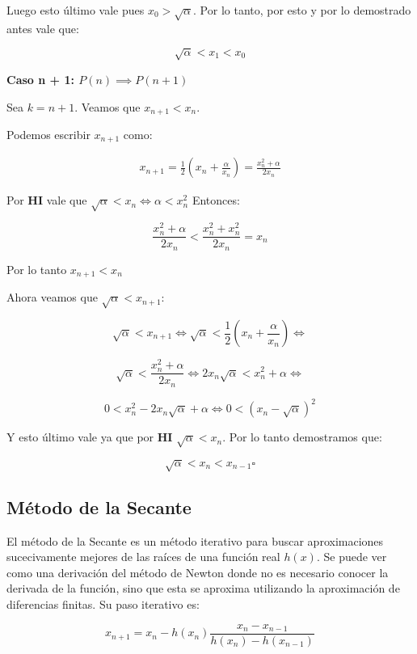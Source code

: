 Luego esto último vale pues $x_0 > \sqrt{\alpha}$. Por lo tanto, por esto y por lo demostrado antes vale que:

\[
    \sqrt{\alpha} < x_1 < x_0
\]

{\bf Caso n + 1: $P(n) \implies P(n + 1)$}

Sea $k = n + 1$. Veamos que $x_{n + 1} < x_n$.

Podemos escribir $x_{n + 1}$ como:

\begin{align*}
    x_{n + 1} = \frac{ 1 }{ 2 }(x_n + \frac{ \alpha }{ x_n }) = \frac{ x_n^2 + \alpha }{ 2x_n }
\end{align*}

Por {\bf HI} vale que $\sqrt{\alpha} < x_n \iff \alpha < x_n^2 $ Entonces:

\[
    \frac{ x_n^2 + \alpha } {2x_n } < \frac{ x_n^2 + x_n^2 }{ 2x_n } = x_n
\]

Por lo tanto $x_{n + 1} < x_n$

Ahora veamos que $\sqrt{\alpha} < x_{n + 1}$:

\[
    \sqrt{\alpha} < x_{n + 1} \iff \sqrt{\alpha} < \frac{1}{2}(x_n + \frac{\alpha}{x_n}) \iff
\]

\[
     \sqrt{\alpha} < \frac{x_n^2 + \alpha}{2x_n} \iff 2x_n\sqrt{\alpha} < x_n^2 + \alpha \iff
\]

\[
     0 < x_n^2 - 2x_n\sqrt{\alpha} + \alpha \iff 0 < {(x_n - \sqrt{\alpha})}^2
\]

Y esto último vale ya que por {\bf HI} $\sqrt{\alpha} < x_n$. Por lo tanto demostramos que:

\[
    \sqrt{\alpha} < x_n < x_{n - 1} \square
\]

\subsection{Método de la Secante}

El método de la Secante es un método iterativo para buscar aproximaciones
sucecivamente mejores de las raíces de una función real $h(x)$. Se puede ver
como una derivación del método de Newton donde no es necesario conocer la
derivada de la función, sino que esta se aproxima utilizando la aproximación de
diferencias finitas. Su paso iterativo es:

\begin{equation}\label{secante}
    x_{n + 1} = x_n - h(x_n) \frac{ x_n - x_{n - 1} }{ h(x_n) - h(x_{n - 1}) }
\end{equation}

